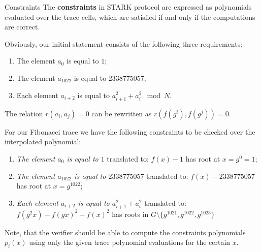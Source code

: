 \documentclass{zkdl-presentation-template}
\begin{document}
\begin{frame}{Constraints}
    The \textbf{constraints} in STARK protocol are expressed as polynomials evaluated over the trace cells, which are satisfied if and only if the computations are correct.
    
    \begin{example}
        Obviously, our initial statement consists of the following three requirements:
        \begin{enumerate}
            \item The element $a_0$ is equal to $1$;
            \item The element $a_{1022}$ is equal to $2338775057$;
            \item Each element $a_{i+2}$ is equal to $a_{i+1}^2 + a_{i}^2 \mod N$.
        \end{enumerate}
    \end{example}
\end{frame}

\begin{frame}
    The relation $r(a_i, a_j) = 0$ can be rewritten as $r(f(g^i), f(g^j)) = 0$.

    \begin{example}
        For our Fibonacci trace we have the following constraints to be checked over the interpolated polynomial:
        \begin{enumerate}
            \item \textit{The element $a_0$ is equal to $1$} translated to: $f(x)-1$ has root at $x = g^0 = 1$;
            \item \textit{The element $a_{1022}$ is equal to $2338775057$} translated to: $f(x) - 2338775057$ has root at $x = g^{1022}$;
            \item \textit{Each element $a_{i+2}$ is equal to $a_{i+1}^2 + a_{i}^2$} translated to: $f(g^2x) - f(gx)^2 - f(x)^2$ has roots in $G \setminus \{g^{1021}, g^{1022}, g^{1023}\}$
        \end{enumerate}
    \end{example}


    Note, that the verifier should be able to compute the constraints polynomials $p_i(x)$ using only the given trace polynomial evaluations for the certain $x$.
    
\end{frame}
\end{document}
